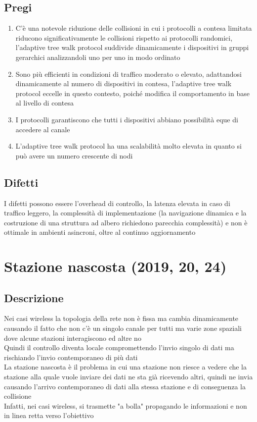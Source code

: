 \documentclass[10pt,oneside,a4paper]{article}
\begin{document}
\subsection{Pregi}
\begin{enumerate}
\item C'è una notevole riduzione delle collisioni in cui i protocolli a contesa limitata riducono significativamente le collisioni rispetto ai protocolli randomici, l'adaptive tree walk protocol suddivide dinamicamente i dispositivi in gruppi gerarchici analizzandoli uno per uno in modo ordinato
\item Sono più efficienti in condizioni di traffico moderato o elevato, adattandosi dinamicamente al numero di dispositivi in contesa, l'adaptive tree walk protocol eccelle in questo contesto, poiché modifica il comportamento in base al livello di contesa
\item I protocolli garantiscono che tutti i dispositivi abbiano possibilità eque di accedere al canale
\item L'adaptive tree walk protocol ha una scalabilità molto elevata in quanto si può avere un numero crescente di nodi
\end{enumerate}
\subsection{Difetti}
I difetti possono essere l'overhead di controllo, la latenza elevata in caso di traffico leggero, la complessità di implementazione (la navigazione dinamica e la costruzione di una struttura ad albero richiedono parecchia complessità) e non è ottimale in ambienti asincroni, oltre al continuo aggiornamento
\section{Stazione nascosta (2019, 20, 24)}
\subsection{Descrizione}
Nei casi wireless la topologia della rete non è fissa ma cambia dinamicamente causando il fatto che non c'è un singolo canale per tutti ma varie zone spaziali dove alcune stazioni interagiscono ed altre no\\
Quindi il controllo diventa locale compromettendo l'invio singolo di dati ma rischiando l'invio contemporaneo di più dati\\
La stazione nascosta è il problema in cui una stazione non riesce a vedere che la stazione alla quale vuole inviare dei dati ne sta già ricevendo altri, quindi ne invia causando l'arrivo contemporaneo di dati alla stessa stazione e di conseguenza la collisione\\
Infatti, nei casi wireless, si trasmette "a bolla" propagando le informazioni e non in linea retta verso l'obiettivo
\end{document}
